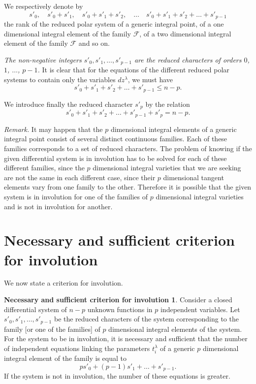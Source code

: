 \documentclass[leqno,11pt]{book}
\numberwithin{equation}{chapter}
\theoremstyle{shape1}
\theoremstyle{shape0}
\theoremstyle{shape2}
\theoremstyle{definition}
\begin{document}
We respectively denote by
\[
s'_{0},\quad s'_{0}+s'_{1},\quad s'_{0}+s'_{1}+s'_{2},\quad\dots\quad s'_{0}+s'_{1}+s'_{2}+\dots+s'_{p-1}
\]
the rank of the reduced polar system of a generic integral point, of a one dimensional integral element of the family $\mathcal{F}$, of a two dimensional integral element of the family $\mathcal{F}$ and so on.

\emph{The non-negative integers $s'_{0},s'_{1},\dots,s'_{p-1}$ are  the reduced characters of orders $0$, $1$, $\dots$, $p-1$.} It is clear that for the equations of the different reduced polar systems to contain only the variables $dz^{\lambda}$, we must have
\[
s'_{0}+s'_{1}+s'_{2}+\dots+s'_{p-1}\le n-p.
\]

We introduce finally the reduced character $s'_{p}$ by the relation
\[
s'_{0}+s'_{1}+s'_{2}+\dots+s'_{p-1}+s'_{p}=n-p.
\]


\vspace{12pt}\fsec \emph{Remark.} It may happen that the $p$ dimensional integral elements of a generic integral point consist of several distinct continuous families. Each of these families corresponds to a set of reduced characters. The problem of knowing if the given differential system is in involution has to be solved for each of these different families, since the $p$ dimensional integral varieties that we are seeking are not the same in each different case, since their $p$ dimensional tangent elements vary from one family to the other. Therefore it is possible that the given system is in involution for one of the families of $p$ dimensional integral varieties and is not in involution for another.


\section{Necessary and sufficient criterion for involution}
\label{sec:necess-suff-crit}

\fsec We now state a criterion for involution.

\theoremstyle{shape1}
\newtheorem*{cnsi}{\hspace{15pt}Necessary and sufficient criterion for involution}
\begin{cnsi}
  Consider a closed differential system of $n-p$ unknown functions in $p$ independent variables. Let $s'_{0},s'_{1},\dots,s'_{p-1}$ be the reduced characters of the system corresponding to the family [or one of the families] of $p$ dimensional integral elements of the system. For the system to be in involution, it is necessary and sufficient that the number of independent equations linking the parameters $t_{i}^{\lambda}$ of a generic $p$ dimensional integral element of the family is equal to 
\[
ps'_{0}+(p-1)s'_{1}+\dots+s'_{p-1}.
\]
If the system is not in involution, the number of these equations is greater.
\end{cnsi}
\end{document}

